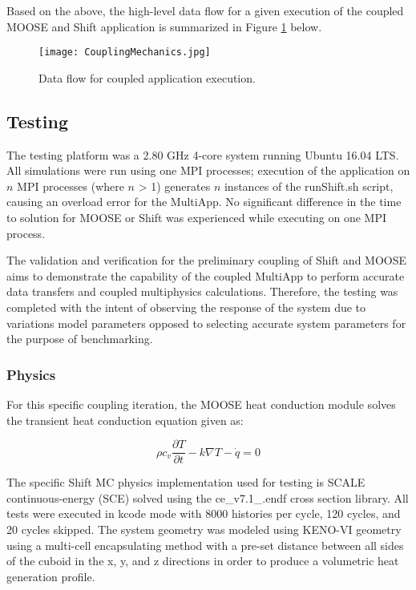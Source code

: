 \documentclass{anstrans}
\begin{document}
Based on the above, the high-level data flow for a given execution of the coupled MOOSE and Shift application is summarized in Figure \ref{fig:DataFlow} below.
\begin{figure}[ht] 
	\centering
	\texttt{[image: CouplingMechanics.jpg]}
	\caption{Data flow for coupled application execution.}
	\label{fig:DataFlow}
\end{figure}

\vspace*{-1em}\subsection{Testing}
The testing platform was a 2.80 GHz 4-core system running Ubuntu 16.04 LTS. All simulations were run using one MPI processes; execution of the application on $n$ MPI processes (where $n$ > 1) generates $n$ instances of the runShift.sh script, causing an overload error for the MultiApp. No significant difference in the time to solution for MOOSE or Shift was experienced while executing on one MPI process. 

The validation and verification for the preliminary coupling of Shift and MOOSE aims to demonstrate the capability of the coupled MultiApp to perform accurate data transfers and coupled multiphysics calculations. Therefore, the testing was completed with the intent of observing the response of the system due to variations model parameters opposed to selecting accurate system parameters for the purpose of benchmarking.

\subsubsection{Physics}
For this specific coupling iteration, the MOOSE heat conduction module solves the transient heat conduction equation given as:

	\begin{equation}
	\rho c_v \frac{\partial T}{\partial t} - k\nabla T - \dot{q} = 0
	\label{eqn:conduction}
	\end{equation} 
	
The specific Shift MC physics implementation used for testing is SCALE continuous-energy (SCE) solved using the ce\_v7.1\_.endf cross section library. All tests were executed in kcode mode with 8000 histories per cycle, 120 cycles, and 20 cycles skipped. The system geometry was modeled using KENO-VI geometry using a multi-cell encapsulating method with a pre-set distance between all sides of the cuboid in the x, y, and z directions in order to produce a volumetric heat generation profile. 
\end{document}
